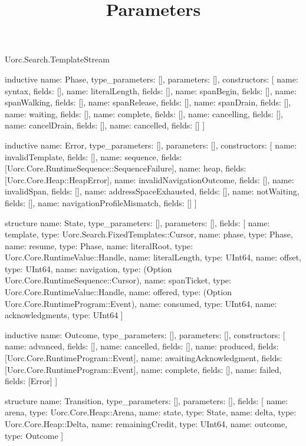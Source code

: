 \begin{lexlean}{Uorc.Search.TemplateStream}
\title{Parameters}
\begin{semanticmodule}
inductive{
  name: Phase,
  type_parameters: [],
  parameters: [],
  constructors: [
    {name: syntax, fields: []},
    {name: literalLength, fields: []},
    {name: spanBegin, fields: []},
    {name: spanWalking, fields: []},
    {name: spanRelease, fields: []},
    {name: spanDrain, fields: []},
    {name: waiting, fields: []},
    {name: complete, fields: []},
    {name: cancelling, fields: []},
    {name: cancelDrain, fields: []},
    {name: cancelled, fields: []}
  ]
}

inductive{
  name: Error,
  type_parameters: [],
  parameters: [],
  constructors: [
    {name: invalidTemplate, fields: []},
    {name: sequence, fields: [Uorc.Core.RuntimeSequence::SequenceFailure]},
    {name: heap, fields: [Uorc.Core.Heap::HeapError]},
    {name: invalidNavigationOutcome, fields: []},
    {name: invalidSpan, fields: []},
    {name: addressSpaceExhausted, fields: []},
    {name: notWaiting, fields: []},
    {name: navigationProfileMismatch, fields: []}
  ]
}

structure{
  name: State,
  type_parameters: [],
  parameters: [],
  fields: [
    {name: template, type: Uorc.Search.FixedTemplates::Cursor},
    {name: phase, type: Phase},
    {name: resume, type: Phase},
    {name: literalRoot, type: Uorc.Core.RuntimeValue::Handle},
    {name: literalLength, type: UInt64},
    {name: offset, type: UInt64},
    {name: navigation, type: (Option Uorc.Core.RuntimeSequence::Cursor)},
    {name: spanTicket, type: Uorc.Core.RuntimeValue::Handle},
    {name: offered, type: (Option Uorc.Core.RuntimeProgram::Event)},
    {name: consumed, type: UInt64},
    {name: acknowledgments, type: UInt64}
  ]
}

inductive{
  name: Outcome,
  type_parameters: [],
  parameters: [],
  constructors: [
    {name: advanced, fields: []},
    {name: cancelled, fields: []},
    {name: produced, fields: [Uorc.Core.RuntimeProgram::Event]},
    {name: awaitingAcknowledgment, fields: [Uorc.Core.RuntimeProgram::Event]},
    {name: complete, fields: []},
    {name: failed, fields: [Error]}
  ]
}

structure{
  name: Transition,
  type_parameters: [],
  parameters: [],
  fields: [
    {name: arena, type: Uorc.Core.Heap::Arena},
    {name: state, type: State},
    {name: delta, type: Uorc.Core.Heap::Delta},
    {name: remainingCredit, type: UInt64},
    {name: outcome, type: Outcome}
  ]
}


\end{semanticmodule}
\end{lexlean}
